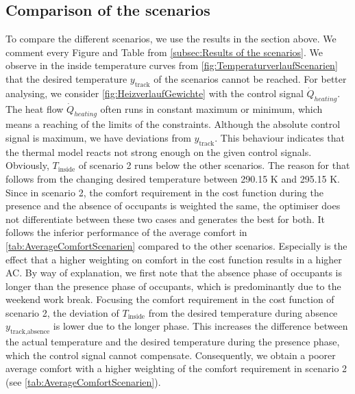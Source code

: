 \subsection{Comparison of the scenarios}
\label{subsec:Comparison fo the scenarios}
To compare the different scenarios, we use the results in the section above. We comment every Figure and Table from \autoref{subsec:Results of the scenarios}. \newline
We observe in the inside temperature curves from \autoref{fig:TemperaturverlaufScenarien} that the desired temperature $y_\text{track}$ of the scenarios cannot be reached. For better analysing, we consider \autoref{fig:HeizverlaufGewichte} with the control signal $\dot{Q}_{heating}$. The heat flow $\dot{Q}_{heating}$ often runs in constant maximum or minimum, which means a reaching of the limits of the constraints. Although the absolute control signal is maximum, we have deviations from $y_\text{track}$. This behaviour indicates that the thermal model reacts not strong enough on the given control signals.\newline
Obviously, $T_\text{inside}$ of scenario 2 runs below the other scenarios. The reason for that follows from the changing desired temperature between 290.15 K and 295.15 K. Since in scenario 2, the comfort requirement in the cost function during the presence and the absence of occupants is weighted the same, the optimiser does not differentiate between these two cases and generates the best for both. It follows the inferior performance of the average comfort in \autoref{tab:AverageComfortScenarien} compared to the other scenarios. Especially is the effect that a higher weighting on comfort in the cost function results in a higher AC. By way of explanation, we first note that the absence phase of occupants is longer than the presence phase of occupants, which is predominantly due to the weekend work break. Focusing the comfort requirement in the cost function of scenario 2, the deviation of $T_\text{inside}$ from the desired temperature during absence $y_\text{track,absence}$ is lower due to the longer phase. This increases the difference between the actual temperature and the desired temperature during the presence phase, which the control signal cannot compensate. Consequently, we obtain a poorer average comfort with a higher weighting of the comfort requirement in scenario 2 (see \autoref{tab:AverageComfortScenarien}).\newline 

